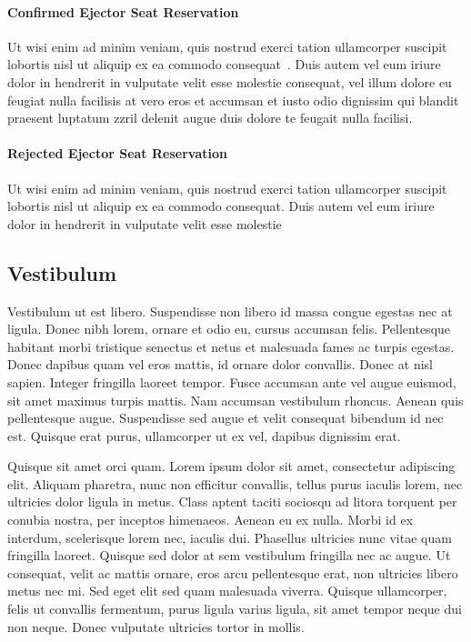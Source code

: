 \documentclass[journal]{vgtc}                %
\begin{document}
\paragraph{Confirmed Ejector Seat Reservation}

Ut wisi enim ad minim veniam, quis nostrud exerci tation ullamcorper
suscipit lobortis nisl ut aliquip ex ea commodo
consequat~\cite{Nielson:1991:TAD}. Duis autem vel eum iriure dolor in
hendrerit in vulputate velit esse molestie consequat, vel illum dolore
eu feugiat nulla facilisis at vero eros et accumsan et iusto odio
dignissim qui blandit praesent luptatum zzril delenit augue duis
dolore te feugait nulla facilisi.

\paragraph{Rejected Ejector Seat Reservation}

Ut wisi enim ad minim veniam, quis nostrud exerci tation ullamcorper
suscipit lobortis nisl ut aliquip ex ea commodo consequat. Duis autem
vel eum iriure dolor in hendrerit in vulputate velit esse molestie

\subsection{Vestibulum}

Vestibulum ut est libero. Suspendisse non libero id massa congue egestas nec at ligula. Donec nibh lorem, ornare et odio eu, cursus accumsan felis. Pellentesque habitant morbi tristique senectus et netus et malesuada fames ac turpis egestas. Donec dapibus quam vel eros mattis, id ornare dolor convallis. Donec at nisl sapien. Integer fringilla laoreet tempor. Fusce accumsan ante vel augue euismod, sit amet maximus turpis mattis. Nam accumsan vestibulum rhoncus. Aenean quis pellentesque augue. Suspendisse sed augue et velit consequat bibendum id nec est. Quisque erat purus, ullamcorper ut ex vel, dapibus dignissim erat.

Quisque sit amet orci quam. Lorem ipsum dolor sit amet, consectetur adipiscing elit. Aliquam pharetra, nunc non efficitur convallis, tellus purus iaculis lorem, nec ultricies dolor ligula in metus. Class aptent taciti sociosqu ad litora torquent per conubia nostra, per inceptos himenaeos. Aenean eu ex nulla. Morbi id ex interdum, scelerisque lorem nec, iaculis dui. Phasellus ultricies nunc vitae quam fringilla laoreet. Quisque sed dolor at sem vestibulum fringilla nec ac augue. Ut consequat, velit ac mattis ornare, eros arcu pellentesque erat, non ultricies libero metus nec mi. Sed eget elit sed quam malesuada viverra. Quisque ullamcorper, felis ut convallis fermentum, purus ligula varius ligula, sit amet tempor neque dui non neque. Donec vulputate ultricies tortor in mollis.
\end{document}
